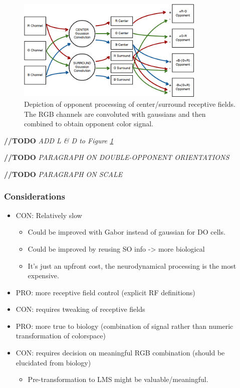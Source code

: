 \documentclass[journal,onecolumn]{IEEEtran}
\begin{document}
\begin{figure}[H]
    \centering
    \includegraphics[width=0.8\textwidth]{model2_mockup}
    \caption{Depiction of opponent processing of center/surround receptive fields. The RGB channels are convoluted with gaussians and then combined to obtain opponent color signal.}
    \label{fig:opponent-process}
\end{figure}

\textbf{//TODO} \textit{ADD L \& D to Figure \ref{fig:opponent-process}}

\textbf{//TODO} \textit{PARAGRAPH ON DOUBLE-OPPONENT ORIENTATIONS}

\textbf{//TODO} \textit{PARAGRAPH ON SCALE}

\subsubsection{Considerations}
\begin{itemize}
    \item CON: Relatively slow
    \begin{itemize}
        \item Could be improved with Gabor instead of gaussian for DO cells.
        \item Could be improved by reusing SO info -> more biological
        \item It's just an upfront cost, the neurodynamical processing is the most expensive.
    \end{itemize}
    \item PRO: more receptive field control (explicit RF definitions)
    \item CON: requires tweaking of receptive fields
    \item PRO: more true to biology (combination of signal rather than numeric transformation of colorspace)
    \item CON: requires decision on meaningful RGB combination (should be elucidated from biology)
    \begin{itemize}
        \item Pre-transformation to LMS might be valuable/meaningful.
    \end{itemize}
\end{itemize}
\end{document}
